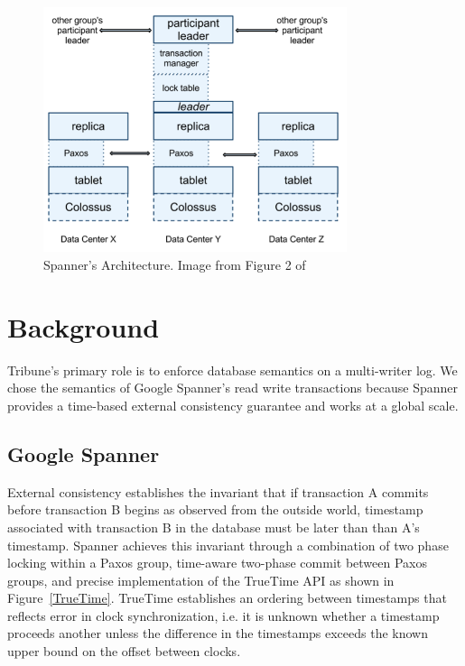 \documentclass[10pt,twocolumn]{article}
\begin{document}
\begin{figure}[!b]
  \begin{center}
    \includegraphics[width=3.5in]{Images/Spanner_Arch.png}
  \end{center}

  \caption{\small Spanner's Architecture. Image from Figure 2 of \cite{corbett_spanner:_2012} }
  \label{Spanner_Arch}
\end{figure}

\section{Background}

Tribune's primary role is to enforce database semantics on a multi-writer log. We chose the semantics of Google Spanner's read write transactions \cite{corbett_spanner:_2012} because Spanner provides a time-based external consistency guarantee and works at a global scale.

\subsection{Google Spanner}

External consistency establishes the invariant that if transaction A commits before transaction B begins as observed from the outside world, timestamp associated with transaction B in the database must be later than than A's timestamp. Spanner achieves this invariant through a combination of two phase locking within a Paxos group, time-aware two-phase commit between Paxos groups, and precise implementation of the TrueTime API as shown in Figure~\ref{TrueTime}. TrueTime establishes an ordering between timestamps that reflects error in clock synchronization, i.e. it is unknown whether a timestamp proceeds another unless the difference in the timestamps exceeds the known upper bound on the offset between clocks.
\end{document}
